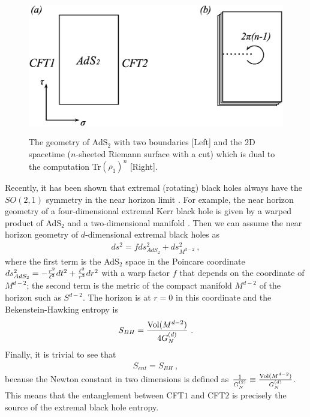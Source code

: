 \documentclass[12pt]{article}
\def\frac#1#2{{#1\over #2}}
\def\frac#1#2{{#1\over #2}}
\begin{document}
\begin{figure}[t]
\begin{center}
\hspace*{1cm}
  \includegraphics[height=6cm]{Riemann.eps}
  \caption{The geometry of AdS$_2$ with two boundaries [Left] and the 2D
 spacetime ($n$-sheeted Riemann surface with a cut) which is dual to the
 computation Tr$(\rho_1)^n$ [Right].}\label{adstwo}
\end{center}
\end{figure}

Recently, it has been shown that extremal (rotating) black holes
always have the $SO(2,1)$ symmetry in the near horizon limit
\cite{Astefanesei:2006dd,Kunduri:2007vf,AY,Kunduri:2008rs,Kunduri:2008tk}.
For example, the near horizon geometry of a four-dimensional extremal Kerr black hole is given by a warped product of
AdS$_2$ and a two-dimensional manifold \cite{BaHo}.
Then we can assume the near horizon geometry of $d$-dimensional extremal black holes as
\begin{align}
 ds^2 = fds^2_{AdS_2} + ds^2_{M^{d-2}} \ ,
\end{align}
where the first term is the AdS$_2$ space in the Poincare coordinate
$ds^2_{AdS_2} = -\frac{r^2}{\ell^2}dt^2 + \frac{\ell^2}{r^2}dr^2$ with a warp factor $f$
that depends on the coordinate of $M^{d-2}$; the
second term is the metric of the compact manifold $M^{d-2}$ of the horizon such as $S^{d-2}$.
The horizon is at $r=0$ in this coordinate and the Bekenstein-Hawking
entropy is
\begin{align}
 S_{BH}= \frac{\text{Vol}(M^{d-2})}{4G_N^{(d)}} \ .
\end{align}
Finally, it is trivial to see that
\begin{align}
 S_{ent}=S_{BH} \ ,
\label{entbb}
\end{align}
because the Newton constant in two dimensions is defined as $\frac{1}{G^{(2)}_N}\equiv
\frac{\text{Vol}(M^{d-2})}{G^{(d)}_{N}}$.
This means that the entanglement between
CFT$1$ and CFT$2$ is precisely the source of the extremal
black hole entropy.
\end{document}
